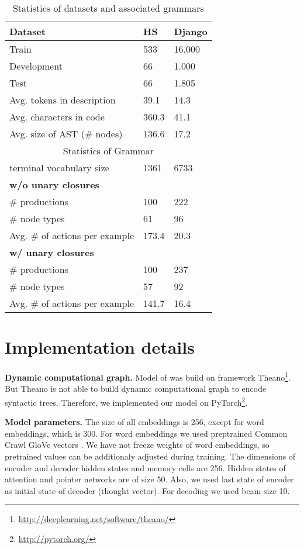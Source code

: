 \begin{table}
\centering
\begin{tabular}[h]{ l l l }
\hline
\textbf{Dataset} & \textbf{HS} & \textbf{Django} \\
\hline 
Train & 533 & 16.000 \\ 
Development & 66 & 1.000 \\ 
Test & 66 & 1.805 \\ 
\hline
Avg. tokens in description & 39.1 & 14.3 \\
Avg. characters in code & 360.3 & 41.1 \\
Avg. size of AST (\# nodes) & 136.6 & 17.2 \\
 \hline
 \hline
\multicolumn{3}{c}{Statistics of Grammar} \\
terminal vocabulary size & 1361 & 6733 \\ 
\hline
\multicolumn{3}{l}{\textbf{w/o unary closures}} \\
\# productions & 100 & 222 \\
\# node types & 61 & 96 \\
Avg. \# of actions per example & 173.4 & 20.3 \\ 
\hline
\multicolumn{3}{l}{\textbf{w/ unary closures}} \\
\# productions & 100 & 237 \\
\# node types & 57 & 92 \\
Avg. \# of actions per example & 141.7 & 16.4 \\ 
\hline
\end{tabular}
\caption{Statistics of datasets and associated grammars \parencite{Yin2017}}
\end{table}

\section{Implementation details}

\textbf{Dynamic computational graph.} Model of \cite{Yin2017} was build on framework Theano\footnote{\href{http://deeplearning.net/software/theano/}{http://deeplearning.net/software/theano/}}. But Theano is not able to build dynamic computational graph to encode syntactic trees. Therefore, we implemented our model on PyTorch\footnote{\href{http://pytorch.org/}{http://pytorch.org/}}.

\textbf{Model parameters.} The size of all embeddings is 256, except for word embeddings, which is 300. For word embeddings we used preptrained Common Crawl GloVe vectors \parencite{pennington2014}. We have not freeze weights of word embeddings, so  pretrained values can be additionaly adjusted during training. The dimensions of encoder and decoder hidden states and memory cells are 256. Hidden states of attention and pointer networks are of size 50. Also, we used last state of encoder as initial state of decoder (thought vector). For decoding we used beam size 10.

